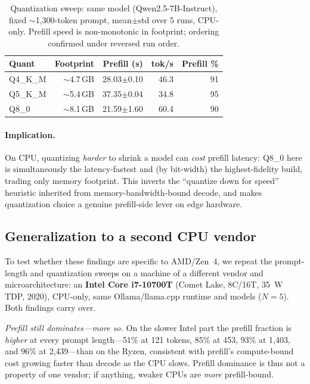 \documentclass[10pt,twocolumn]{article}
\begin{document}
\begin{table}[t]
  \centering
  \caption{Quantization sweep: same model (Qwen2.5-7B-Instruct), fixed
  $\sim$1{,}300-token prompt, mean$\pm$std over 5 runs, CPU-only. Prefill
  speed is non-monotonic in footprint; ordering confirmed under reversed
  run order.}
  \label{tab:quant}
  \small
  \begin{tabular}{lrrrr}
    \toprule
    Quant & Footprint & Prefill (s) & tok/s & Prefill \% \\
    \midrule
    Q4\_K\_M & $\sim$4.7\,GB & 28.03$\pm$0.10 & 46.3 & 91 \\
    Q5\_K\_M & $\sim$5.4\,GB & 37.35$\pm$0.04 & 34.8 & 95 \\
    Q8\_0    & $\sim$8.1\,GB & 21.59$\pm$1.60 & 60.4 & 90 \\
    \bottomrule
  \end{tabular}
\end{table}

\paragraph{Implication.}
On CPU, quantizing \emph{harder} to shrink a model can \emph{cost} prefill
latency: Q8\_0 here is simultaneously the latency-fastest and (by bit-width)
the highest-fidelity build, trading only memory footprint. This inverts the
``quantize down for speed'' heuristic inherited from memory-bandwidth-bound
decode, and makes quantization choice a genuine prefill-side lever on edge
hardware.

\subsection{Generalization to a second CPU vendor}
\label{sec:results-intel}
To test whether these findings are specific to AMD/Zen~4, we repeat the
prompt-length and quantization sweeps on a machine of a different vendor and
microarchitecture: an \textbf{Intel Core i7-10700T} (Comet Lake, 8C/16T,
35~W TDP, 2020), CPU-only, same Ollama/llama.cpp runtime and models
($N{=}5$). Both findings carry over.

\emph{Prefill still dominates---more so.} On the slower Intel part the
prefill fraction is \emph{higher} at every prompt length---51\% at 121
tokens, 85\% at 453, 93\% at 1{,}403, and 96\% at 2{,}439---than on the
Ryzen, consistent with prefill's compute-bound cost growing faster than
decode as the CPU slows. Prefill dominance is thus not a property of one
vendor; if anything, weaker CPUs are \emph{more} prefill-bound.
\end{document}

